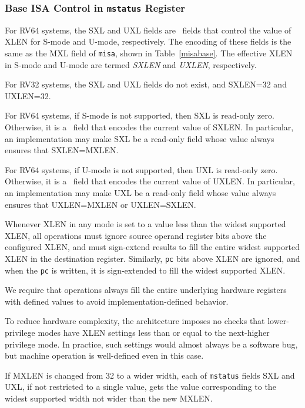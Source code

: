 \subsubsection{Base ISA Control in {\tt mstatus} Register}
\label{xlen-control}

For RV64 systems, the SXL and UXL fields are \warl\ fields
that control the value of XLEN for S-mode and U-mode,
respectively. The encoding of these fields is the same as the MXL
field of {\tt misa}, shown in Table~\ref{misabase}.  The effective
XLEN in S-mode and U-mode are termed {\em SXLEN} and {\em UXLEN},
respectively.

For RV32 systems, the SXL and UXL fields do not exist, and
SXLEN=32 and UXLEN=32.

For RV64 systems, if S-mode is not supported, then SXL is read-only
zero.  Otherwise, it is a \warl\ field that encodes the current value of
SXLEN.  In particular, an implementation may make SXL be a read-only
field whose value always ensures that SXLEN=MXLEN.

For RV64 systems, if U-mode is not supported, then UXL is read-only
zero.  Otherwise, it is a \warl\ field that encodes the current value of
UXLEN.  In particular, an implementation may make UXL be a read-only
field whose value always ensures that UXLEN=MXLEN or UXLEN=SXLEN.

Whenever XLEN in any mode is set to a value less than the widest
supported XLEN, all operations must ignore source operand register
bits above the configured XLEN, and must sign-extend results to fill
the entire widest supported XLEN in the destination register.
Similarly, {\tt pc} bits above XLEN are ignored, and when the {\tt pc}
is written, it is sign-extended to fill the widest supported XLEN.
\begin{commentary}
We require that operations always fill the entire underlying hardware
registers with defined values to avoid implementation-defined
behavior.

To reduce hardware complexity, the architecture imposes no checks that
lower-privilege modes have XLEN settings less than or equal to the
next-higher privilege mode.  In practice, such settings would almost
always be a software bug, but machine operation is well-defined even in this
case.
\end{commentary}

If MXLEN is changed from 32 to a wider width, each of {\tt mstatus} fields SXL and
UXL, if not restricted to a single value, gets the value corresponding to the
widest supported width not wider than the new MXLEN.

